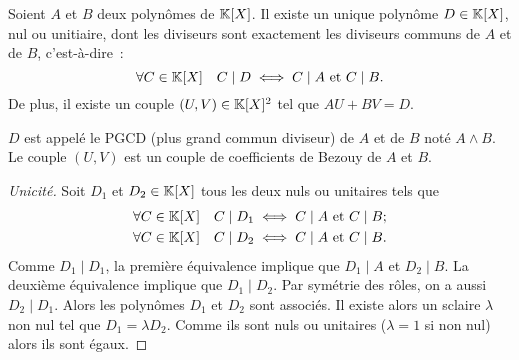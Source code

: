 \begin{prop}
  Soient $A$ et $B$ deux polynômes de $\mathbb{K}[X]$. Il existe un unique polynôme $D \in \mathbb{K}[X]$, nul ou unitiaire, dont les diviseurs sont exactement les diviseurs communs de $A$ et de $B$, c'est-à-dire~:
  \begin{equation}
    \forall C \in \mathbb{K}[X] \quad C\mid{}D \iff C\mid{}A \text{~et~} C\mid{}B.
  \end{equation}
  De plus, il existe un couple $(U,V) \in \mathbb{K}[X]^2$ tel que $AU+BV=D$.

  $D$ est appelé le PGCD (plus grand commun diviseur) de $A$ et de $B$ noté $A \wedge B$. Le couple $(U,V)$ est un couple de coefficients de Bezouy de $A$ et $B$.
\end{prop}
\begin{proof}[Unicité]
  Soit $D_1$ et $D_2 \in \mathbb{K}[X]$ tous les deux nuls ou unitaires tels que
\begin{align}
    \forall C \in \mathbb{K}[X] \quad C\mid{}D_1 &\iff C\mid{}A \text{~et~} C\mid{}B; \\
    \forall C \in \mathbb{K}[X] \quad C\mid{}D_2 &\iff C\mid{}A \text{~et~} C\mid{}B.
  \end{align}
  Comme $D_1\mid{}D_1$, la première équivalence implique que $D_1\mid{}A$ et $D_2\mid{}B$. La deuxième équivalence implique que $D_1\mid{}D_2$. Par symétrie des rôles, on a aussi $D_2\mid{}D_1$. Alors les polynômes $D_1$ et $D_2$ sont associés. Il existe alors un sclaire $\lambda$ non nul tel que $D_1=\lambda D_2$. Comme ils sont nuls ou unitaires ($\lambda=1$ si non nul) alors ils sont égaux.
\end{proof}
